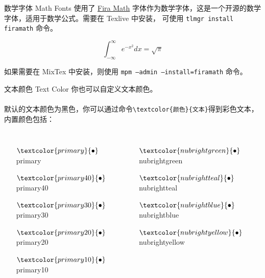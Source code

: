 \documentclass[10pt,aspectratio=169,fontset=none]{ctexbeamer}
\begin{document}
    \begin{frame}{数学字体 Math Fonts}
        使用了 \href{https://github.com/firamath/firamath}{Fira Math} 字体作为数学字体，这是一个开源的数学字体，适用于数学公式。需要在 Texlive 中安装， 可使用 \texttt{\alert{tlmgr} install firamath} 命令。

        \begin{equation}
            \int_{-\infty}^{\infty} e^{-x^2} dx = \sqrt{\pi}
        \end{equation}

        如果需要在 MixTex 中安装，则使用 \texttt{\alert{mpm} --admin --install=firamath} 命令。

    \end{frame}

    \begin{frame}{文本颜色 Text Color}
        你也可以自定义文本颜色。
        \\ ~ \\
        默认的文本颜色为黑色，你可以通过命令\texttt{\textbackslash textcolor\{颜色\}\{文本\}}得到彩色文本，内置颜色包括：
        \begin{columns}
            \begin{itemize}
                \item[$\textcolor{primary}{\bullet}$] \textcolor{primary}{primary} 
                \item[$\textcolor{primary40}{\bullet}$] \textcolor{primary40}{primary40}
                \item[$\textcolor{primary30}{\bullet}$] \textcolor{primary30}{primary30}
                \item[$\textcolor{primary20}{\bullet}$] \textcolor{primary20}{primary20}
                \item[$\textcolor{primary10}{\bullet}$] \textcolor{primary10}{primary10}
            \end{itemize}
            \begin{itemize}
                \item[$\textcolor{nubrightgreen}{\bullet}$] \textcolor{nubrightgreen}{nubrightgreen}
                \item[$\textcolor{nubrightteal}{\bullet}$] \textcolor{nubrightteal}{nubrightteal}
                \item[$\textcolor{nubrightblue}{\bullet}$] \textcolor{nubrightblue}{nubrightblue}
                \item[$\textcolor{nubrightyellow}{\bullet}$] \textcolor{nubrightyellow}{nubrightyellow}

\end{itemize}
\end{columns}
\end{frame}
\end{document}

